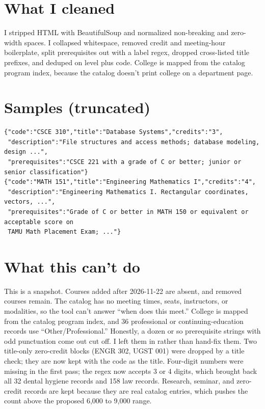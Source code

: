 \documentclass[9.5pt]{article}
\begin{document}
\section*{What I cleaned}
I stripped HTML with BeautifulSoup and normalized non-breaking and zero-width spaces. I collapsed whitespace, removed credit and meeting-hour boilerplate, split prerequisites out with a label regex, dropped cross-listed title prefixes, and deduped on level plus code. College is mapped from the catalog program index, because the catalog doesn't print college on a department page.

\section*{Samples (truncated)}
{\footnotesize
\begin{verbatim}
{"code":"CSCE 310","title":"Database Systems","credits":"3",
 "description":"File structures and access methods; database modeling, design ...",
 "prerequisites":"CSCE 221 with a grade of C or better; junior or senior classification"}
{"code":"MATH 151","title":"Engineering Mathematics I","credits":"4",
 "description":"Engineering Mathematics I. Rectangular coordinates, vectors, ...",
 "prerequisites":"Grade of C or better in MATH 150 or equivalent or acceptable score on
 TAMU Math Placement Exam; ..."}
\end{verbatim}
}

\section*{What this can't do}
This is a snapshot. Courses added after 2026-11-22 are absent, and removed courses remain. The catalog has no meeting times, seats, instructors, or modalities, so the tool can't answer ``when does this meet.'' College is mapped from the catalog program index, and 36 professional or continuing-education records use ``Other/Professional.'' Honestly, a dozen or so prerequisite strings with odd punctuation come out cut off. I left them in rather than hand-fix them. Two title-only zero-credit blocks (ENGR 302, UGST 001) were dropped by a title check; they are now kept with the code as the title. Four-digit numbers were missing in the first pass; the regex now accepts 3 or 4 digits, which brought back all 32 dental hygiene records and 158 law records. Research, seminar, and zero-credit records are kept because they are real catalog entries, which pushes the count above the proposed 6,000 to 9,000 range.
\end{document}
